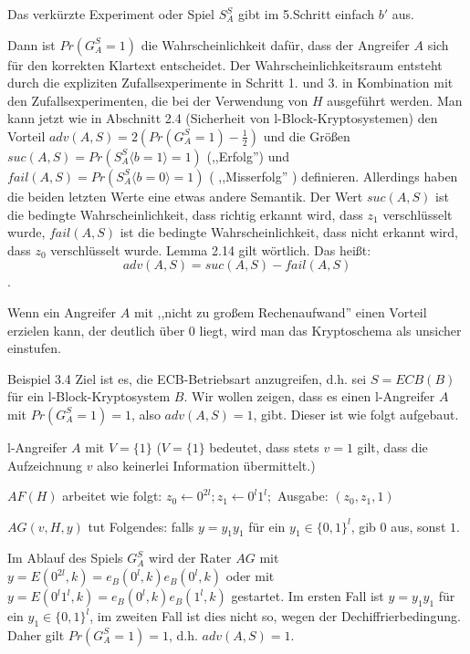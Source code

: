\documentclass[a4paper]{article}
\begin{document}
\begin{multicols}{3}
    Das verkürzte Experiment oder Spiel $S^S_A$ gibt im 5.Schritt einfach $b'$ aus.

    Dann ist  $Pr(G^S_A = 1)$ die Wahrscheinlichkeit dafür, dass der Angreifer $A$ sich für den korrekten Klartext entscheidet. Der Wahrscheinlichkeitsraum entsteht durch die expliziten Zufallsexperimente in Schritt 1. und 3. in Kombination mit den Zufallsexperimenten, die bei der Verwendung von $H$ ausgeführt werden. Man kann jetzt wie in Abschnitt 2.4 (Sicherheit von l-Block-Kryptosystemen) den Vorteil $adv(A,S) = 2(Pr(G^S_A= 1)-\frac{1}{2})$ und die Größen $suc(A,S) = Pr(S^S_A\langle b= 1\rangle = 1)$ (,,Erfolg'') und $fail(A,S) = Pr(S_A^S\langle b= 0\rangle = 1)$ ( ,,Misserfolg'' ) definieren. Allerdings haben die beiden letzten Werte eine etwas andere Semantik. Der Wert $suc(A,S)$ ist die bedingte Wahrscheinlichkeit, dass richtig erkannt wird, dass $z_1$ verschlüsselt wurde, $fail(A,S)$ ist die bedingte Wahrscheinlichkeit, dass nicht erkannt wird, dass $z_0$ verschlüsselt wurde. Lemma 2.14 gilt wörtlich. Das heißt: $$adv(A,S) = suc(A,S)-fail(A,S)$$.

    Wenn ein Angreifer $A$ mit ,,nicht zu großem Rechenaufwand'' einen Vorteil erzielen kann, der deutlich über $0$ liegt, wird man das Kryptoschema als unsicher einstufen.

    Beispiel 3.4 Ziel ist es, die ECB-Betriebsart anzugreifen, d.h. sei $S=ECB(B)$ für ein l-Block-Kryptosystem $B$. Wir wollen zeigen, dass es einen l-Angreifer $A$ mit $Pr(G^S_A= 1) = 1$, also $adv(A,S) = 1$, gibt. Dieser ist wie folgt aufgebaut.
    \begin{itemize*}
        \item l-Angreifer $A$ mit $V=\{1\}$ ($V=\{1\}$ bedeutet, dass stets $v=1$ gilt, dass die Aufzeichnung $v$ also keinerlei Information übermittelt.)
        \item $AF(H)$ arbeitet wie folgt: $z_0\leftarrow 0^{2l}; z_1\leftarrow 0^l 1^l;$ Ausgabe: $(z_0,z_1 ,1)$
        \item $AG(v,H,y)$ tut Folgendes: falls $y=y_1y_1$ für ein $y_1\in\{0,1\}^l$, gib $0$ aus, sonst $1$.
    \end{itemize*}

    Im Ablauf des Spiels $G^S_A$ wird der Rater $AG$ mit $y=E(0^{2l},k)=e_B(0^l,k)e_B(0^l,k)$ oder mit $y=E(0^l 1^l,k)=e_B(0^l,k)e_B(1^l,k)$ gestartet. Im ersten Fall ist $y=y_1y_1$ für ein $y_1\in\{0,1\}^l$, im zweiten Fall ist dies nicht so, wegen der Dechiffrierbedingung. Daher gilt $Pr(G^S_A= 1) = 1$, d.h. $adv(A,S) = 1$.


\end{multicols}
\end{document}
